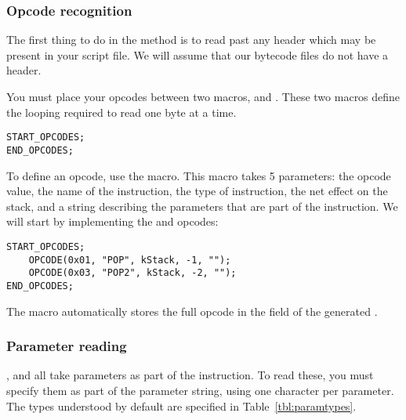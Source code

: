 \subsubsection{Opcode recognition}
The first thing to do in the  method is to read past any header which may be present in your script file. We will assume that our bytecode files do not have a header.

You must place your opcodes between two macros,  and . These two macros define the looping required to read one byte at a time.

\begin{C++}
\begin{lstlisting}
START_OPCODES;
END_OPCODES;
\end{lstlisting}
\end{C++}

To define an opcode, use the  macro. This macro takes 5 parameters: the opcode value, the name of the instruction, the type of instruction, the net effect on the stack, and a string describing the parameters that are part of the instruction. We will start by implementing the  and  opcodes:

\begin{C++}
\begin{lstlisting}
START_OPCODES;
	OPCODE(0x01, "POP", kStack, -1, "");
	OPCODE(0x03, "POP2", kStack, -2, "");
END_OPCODES;
\end{lstlisting}
\end{C++}

The  macro automatically stores the full opcode in the  field of the generated .

\subsubsection{Parameter reading}
,  and  all take parameters as part of the instruction. To read these, you must specify them as part of the parameter string, using one character per parameter. The types understood by default are specified in Table~\vref{tbl:paramtypes}.

